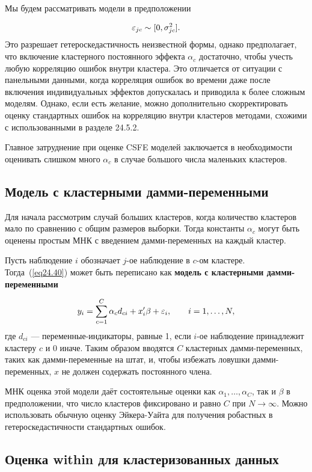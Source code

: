 Мы будем рассматривать модели в предположении

$$
\varepsilon_{jc} \sim [0, \sigma^2_{jc}].
$$
Это разрешает гетероскедастичность неизвестной формы, однако предполагает, что включение кластерного постоянного эффекта $\alpha_c$ достаточно, чтобы учесть любую корреляцию ошибок внутри кластера. Это отличается от ситуации с панельными данными, когда корреляция ошибок во времени даже после включения индивидуальных эффектов допускалась и приводила к более сложным моделям. Однако, если есть желание, можно дополнительно скорректировать оценку стандартных ошибок на корреляцию внутри кластеров методами, схожими с использованными в разделе 24.5.2. 

Главное затруднение при оценке CSFE моделей заключается в необходимости оценивать слишком много $\alpha_c$ в случае большого числа маленьких кластеров. 

\subsection*{Модель с кластерными дамми-переменными}

Для начала рассмотрим случай больших кластеров, когда количество кластеров мало по сравнению с общим размеров выборки. Тогда константы $\alpha_c$ могут быть оценены простым МНК с введением дамми-переменных на каждый кластер. 

Пусть наблюдение $i$ обозначает $j$-ое наблюдение в $c$-ом кластере. Тогда~(\ref{eq24.40}) может быть переписано как \bfseries модель с кластерными дамми-переменными \mdseries

\begin{equation}
\label{eq24.41}
y_i = \sum_{c=1}^C \alpha_c d_{ci} + x'_i \beta + \varepsilon_i, \qquad i= 1, \dots , N,
\end{equation}
где $d_{ci}$ --- переменные-индикаторы, равные 1, если $i$-ое наблюдение принадлежит кластеру $c$ и 0 иначе. Таким образом вводятся $C$ кластерных дамми-переменных, таких как дамми-переменные на штат, и, чтобы избежать ловушки дамми-переменных, $x$ не должен содержать постоянного члена. 

МНК оценка этой модели даёт состоятельные оценки как $\alpha_1, \dots, \alpha_C$, так и $\beta$ в предположении, что число кластеров фиксировано и равно $C$ при $N \to \infty$. Можно использовать обычную оценку Эйкера-Уайта для получения робастных в гетероскедастичности стандартных ошибок. 

\subsection*{Оценка within для кластеризованных данных}

